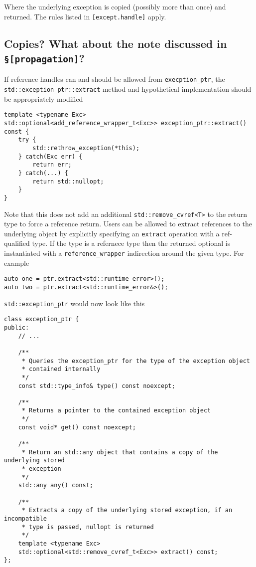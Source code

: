 \documentclass{article}
\begin{document}
Where the underlying exception is copied (possibly more than once) and
returned.  The rules listed in \texttt{[except.handle]} apply.

\subsection{Copies? What about the note discussed in \texttt{§[propagation]}?}

If reference handles can and should be allowed from \texttt{execption\_ptr},
the \texttt{std::exception\_ptr::extract} method and hypothetical
implementation should be appropriately modified

\begin{lstlisting}
template <typename Exc>
std::optional<add_reference_wrapper_t<Exc>> exception_ptr::extract() const {
    try {
        std::rethrow_exception(*this);
    } catch(Exc err) {
        return err;
    } catch(...) {
        return std::nullopt;
    }
}
\end{lstlisting}

Note that this does not add an additional \texttt{std::remove\_cvref<T>} to
the return type to force a reference return.  Users can be allowed to extract
references to the underlying object by explicitly specifying an
\texttt{extract} operation with a ref-qualified type.  If the type is a
refernece type then the returned optional is instantiated with a
\texttt{reference\_wrapper} indirection around the given type.  For example

\begin{lstlisting}
auto one = ptr.extract<std::runtime_error>();
auto two = ptr.extract<std::runtime_error&>();
\end{lstlisting}

\texttt{std::exception\_ptr} would now look like this
\begin{lstlisting}
class exception_ptr {
public:
    // ...

    /**
     * Queries the exception_ptr for the type of the exception object
     * contained internally
     */
    const std::type_info& type() const noexcept;

    /**
     * Returns a pointer to the contained exception object
     */
    const void* get() const noexcept;

    /**
     * Return an std::any object that contains a copy of the underlying stored
     * exception
     */
    std::any any() const;

    /**
     * Extracts a copy of the underlying stored exception, if an incompatible
     * type is passed, nullopt is returned
     */
    template <typename Exc>
    std::optional<std::remove_cvref_t<Exc>> extract() const;
};
\end{lstlisting}
\end{document}
